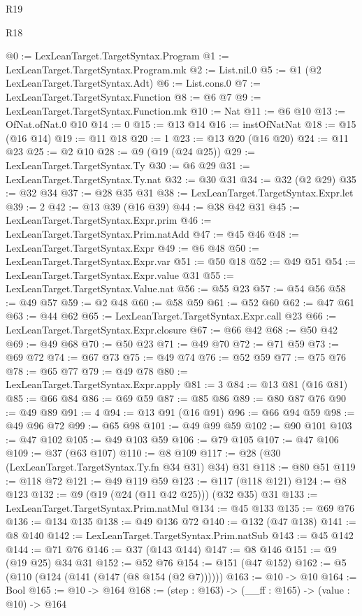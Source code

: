 \begin{lexlean}{R19}
\begin{lexlean}{R18}
\begin{coremodule}
{{{{{{{{{{{{{@0 := LexLeanTarget.TargetSyntax.Program
@1 := LexLeanTarget.TargetSyntax.Program.mk
@2 := List.nil.{0}
@5 := @1 (@2 LexLeanTarget.TargetSyntax.Adt)
@6 := List.cons.{0}
@7 := LexLeanTarget.TargetSyntax.Function
@8 := @6 @7
@9 := LexLeanTarget.TargetSyntax.Function.mk
@10 := Nat
@11 := @6 @10
@13 := OfNat.ofNat.{0} @10
@14 := 0
@15 := @13 @14
@16 := instOfNatNat
@18 := @15 (@16 @14)
@19 := @11 @18
@20 := 1
@23 := @13 @20 (@16 @20)
@24 := @11 @23
@25 := @2 @10
@28 := @9 (@19 (@24 @25))
@29 := LexLeanTarget.TargetSyntax.Ty
@30 := @6 @29
@31 := LexLeanTarget.TargetSyntax.Ty.nat
@32 := @30 @31
@34 := @32 (@2 @29)
@35 := @32 @34
@37 := @28 @35 @31
@38 := LexLeanTarget.TargetSyntax.Expr.let
@39 := 2
@42 := @13 @39 (@16 @39)
@44 := @38 @42 @31
@45 := LexLeanTarget.TargetSyntax.Expr.prim
@46 := LexLeanTarget.TargetSyntax.Prim.natAdd
@47 := @45 @46
@48 := LexLeanTarget.TargetSyntax.Expr
@49 := @6 @48
@50 := LexLeanTarget.TargetSyntax.Expr.var
@51 := @50 @18
@52 := @49 @51
@54 := LexLeanTarget.TargetSyntax.Expr.value @31
@55 := LexLeanTarget.TargetSyntax.Value.nat
@56 := @55 @23
@57 := @54 @56
@58 := @49 @57
@59 := @2 @48
@60 := @58 @59
@61 := @52 @60
@62 := @47 @61
@63 := @44 @62
@65 := LexLeanTarget.TargetSyntax.Expr.call @23
@66 := LexLeanTarget.TargetSyntax.Expr.closure
@67 := @66 @42
@68 := @50 @42
@69 := @49 @68
@70 := @50 @23
@71 := @49 @70
@72 := @71 @59
@73 := @69 @72
@74 := @67 @73
@75 := @49 @74
@76 := @52 @59
@77 := @75 @76
@78 := @65 @77
@79 := @49 @78
@80 := LexLeanTarget.TargetSyntax.Expr.apply
@81 := 3
@84 := @13 @81 (@16 @81)
@85 := @66 @84
@86 := @69 @59
@87 := @85 @86
@89 := @80 @87 @76
@90 := @49 @89
@91 := 4
@94 := @13 @91 (@16 @91)
@96 := @66 @94 @59
@98 := @49 @96 @72
@99 := @65 @98
@101 := @49 @99 @59
@102 := @90 @101
@103 := @47 @102
@105 := @49 @103 @59
@106 := @79 @105
@107 := @47 @106
@109 := @37 (@63 @107)
@110 := @8 @109
@117 := @28 (@30 (LexLeanTarget.TargetSyntax.Ty.fn @34 @31) @34) @31
@118 := @80 @51
@119 := @118 @72
@121 := @49 @119 @59
@123 := @117 (@118 @121)
@124 := @8 @123
@132 := @9 (@19 (@24 (@11 @42 @25))) (@32 @35) @31
@133 := LexLeanTarget.TargetSyntax.Prim.natMul
@134 := @45 @133
@135 := @69 @76
@136 := @134 @135
@138 := @49 @136 @72
@140 := @132 (@47 @138)
@141 := @8 @140
@142 := LexLeanTarget.TargetSyntax.Prim.natSub
@143 := @45 @142
@144 := @71 @76
@146 := @37 (@143 @144)
@147 := @8 @146
@151 := @9 (@19 @25) @34 @31
@152 := @52 @76
@154 := @151 (@47 @152)
@162 := @5 (@110 (@124 (@141 (@147 (@8 @154 (@2 @7))))))
@163 := @10 -> @10
@164 := Bool
@165 := @10 -> @164
@168 := (step : @163) -> (__ff : @165) -> (value : @10) -> @164
}}}}}}}}}}}}}
\end{coremodule}
\end{lexlean}
\end{lexlean}
